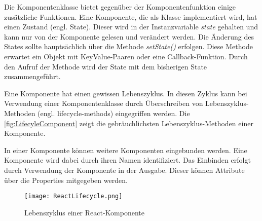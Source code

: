 
Die Komponentenklasse bietet gegenüber der Komponentenfunktion einige zusätzliche Funktionen. Eine  Komponente, die als Klasse implementiert wird, hat einen Zustand (engl. State). Dieser wird in der Instanzvariable \textit{state} gehalten und kann nur von der Komponente gelesen und verändert werden. Die Änderung des States sollte hauptsächlich über die Methode \textit{setState()} erfolgen. Diese Methode  erwartet ein Objekt mit KeyValue-Paaren oder eine Callback-Funktion. Durch den Aufruf der Methode wird der State mit dem bisherigen State zusammengeführt.\autocites[vgl.][24\psq,89-93]{Zeigermann.2016}[vgl.][17\psq]{Stefanov.2017}

Eine Komponente hat einen gewissen Lebenszyklus. In diesen Zyklus kann bei Verwendung einer Komponentenklasse durch Überschreiben von Lebenszyklus-Methoden (engl. lifecycle-methods) eingegriffen werden. Die \autoref{fig:LifecyleComponent} zeigt die gebräuchlichsten Lebenszyklus-Methoden einer Komponente.\autocites[vgl.][96-100]{Zeigermann.2016}[vgl.][]{Facebook.2018b}

In einer Komponente können weitere Komponenten eingebunden werden. Eine Komponente wird dabei durch ihren Namen identifiziert. Das Einbinden erfolgt durch Verwendung der Komponente in der Ausgabe. Dieser können Attribute über die Properties mitgegeben werden.\autocites[vgl.][111\psqq]{Zeigermann.2016}




\begin{figure}
	\centering
	\texttt{[image: ReactLifecycle.png]}
	\caption{Lebenszyklus einer  React-Komponente} 
	\label{fig:LifecyleComponent}
\end{figure}



